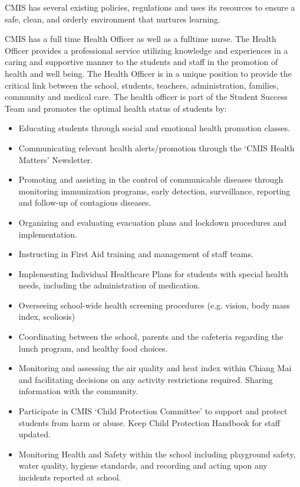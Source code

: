 \begin{findings}
CMIS has several existing policies, regulations and uses its resources to ensure a safe, clean, and orderly environment that nurtures learning.

CMIS has a full time Health Officer as well as a fulltime nurse. The Health Officer provides a professional service utilizing knowledge and experiences in a caring and supportive manner to the students and staff in the promotion of health and well being. The Health Officer is in a unique position to provide the critical link between the school, students, teachers, administration, families, community and medical care. The health officer is part of the Student Success Team and promotes the optimal health status of students by: 
	 	 	
\begin{itemize}
\item Educating students through social and emotional health promotion classes.
\item Communicating relevant health alerts/promotion through the ‘CMIS Health Matters’ Newsletter. 
\item Promoting and assisting in the control of communicable diseases through monitoring immunization programs, early detection, surveillance, reporting and follow-up of contagious diseases.
\item Organizing and evaluating evacuation plans and lockdown procedures and implementation. 
\item Instructing in First Aid training and management of staff teams.
\item Implementing Individual Healthcare Plans for students with special health needs, including the administration of medication.
\item Overseeing school-wide health screening procedures (e.g. vision, body mass index, scoliosis) 
\item Coordinating between the school, parents and the cafeteria regarding the lunch program, and healthy food choices.
\item Monitoring and assessing the air quality and heat index within Chiang Mai and facilitating decisions on any activity restrictions required. Sharing information with the community.
\item Participate in CMIS ‘Child Protection Committee’ to support and protect students from harm  or abuse. Keep Child Protection Handbook  for staff updated.
\item Monitoring Health and Safety within the school including playground safety, water quality, hygiene standards, and recording and acting upon any incidents reported at school. 
\end{itemize}


\end{findings}
